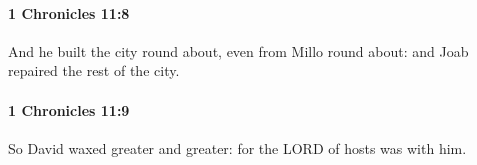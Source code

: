 		\paragraph{1 Chronicles 11:8} %
			\label{1CHRONICLES-11-8}

			And he built the city round about, even from Millo round about: and Joab repaired the rest of the city.


		\paragraph{1 Chronicles 11:9} %
			\label{1CHRONICLES-11-9}

			So David waxed greater and greater: for the LORD of hosts was with him.


